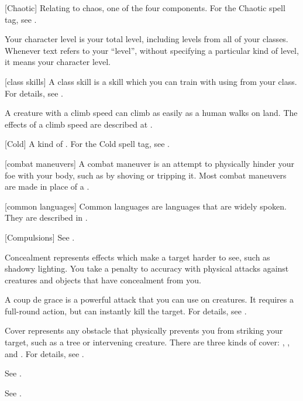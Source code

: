 [Chaotic] Relating to chaos, one of the four  components. For the Chaotic spell tag, see .

 Your character level is your total level, including levels from all of your classes.
Whenever text refers to your ``level'', without specifying a particular kind of level, it means your character level.

[class skills] A class skill is a skill which you can train with using  from your class. For details, see .

 A creature with a climb speed can climb as easily as a human walks on land.
The effects of a climb speed are described at .

[Cold] A kind of . For the Cold spell tag, see .

[combat maneuvers] A combat maneuver is an attempt to physically hinder your foe with your body, such as by shoving or tripping it.
Most combat maneuvers are made in place of a .

[common languages] Common languages are languages that are widely spoken.
They are described in .

[Compulsions] See .

 Concealment represents effects which make a target harder to see, such as shadowy lighting.
You take a  penalty to accuracy with physical attacks against creatures and objects that have concealment from you.

 A coup de grace is a powerful attack that you can use on \helpless creatures.
It requires a full-round action, but can instantly kill the target.
For details, see .

 Cover represents any obstacle that physically prevents you from striking your target, such as a tree or intervening creature.
There are three kinds of cover: , , and .
For details, see .

 See .

 See .

